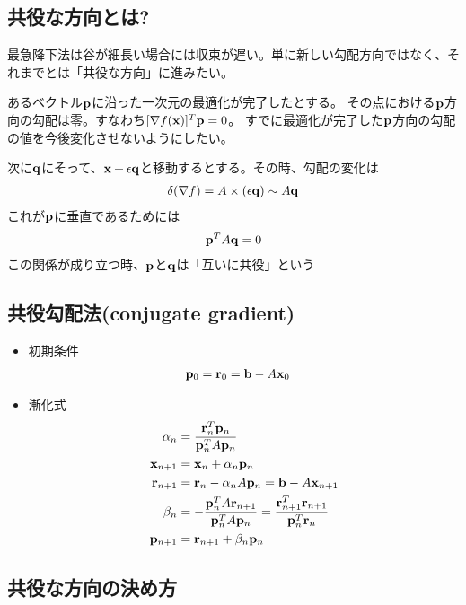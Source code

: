 \documentclass[11pt]{jarticle}
\begin{document}
\subsection{共役な方向とは?}

最急降下法は谷が細長い場合には収束が遅い。単に新しい勾配方向ではなく、それまでとは「共役な方向」に進みたい。

あるベクトル${\bf p}$に沿った一次元の最適化が完了したとする。
その点における${\bf p}$方向の勾配は零。すなわち$[\nabla f({\bf x})]^T{\bf p}=0$。
すでに最適化が完了した${\bf p}$方向の勾配の値を今後変化させないようにしたい。

次に${\bf q}$にそって、${\bf x}+\epsilon {\bf q}$と移動するとする。その時、勾配の変化は
\begin{align}
\delta(\nabla f) = A \times (\epsilon {\bf q}) \sim A {\bf q}
\end{align}
これが${\bf p}$に垂直であるためには
\begin{align}
  {\bf p}^T A {\bf q} = 0
\end{align}
この関係が成り立つ時、${\bf p}$と${\bf q}$は「互いに共役」という

\subsection{共役勾配法(conjugate gradient)}

\begin{itemize}
\item 初期条件
  \begin{align}
    {\bf p}_0 &= {\bf r}_0 = {\bf b} - A {\bf x}_0
  \end{align}
\item 漸化式
\begin{align}
  \alpha_n &= \frac{{\bf r}_n^T {\bf p}_n}{{\bf p}_n^T A {\bf p}_n} \\
  {\bf x}_{n+1} &= {\bf x}_n + \alpha_n {\bf p}_n \\
  {\bf r}_{n+1} &= {\bf r}_n - \alpha_n A {\bf p}_n = {\bf b} - A {\bf x}_{n+1} \\
  \beta_n &= - \frac{{\bf p}_{n}^T A {\bf r}_{n+1}}{{\bf p}_n^T A {\bf p}_n} = \frac{{\bf r}_{n+1}^T {\bf r}_{n+1}}{{\bf p}_{n}^T{\bf r}_{n}}
  \label{eqn:beta} \\
  {\bf p}_{n+1} &= {\bf r}_{n+1} + \beta_n {\bf p}_n
\end{align}
\end{itemize}

\subsection{共役な方向の決め方}
\end{document}
